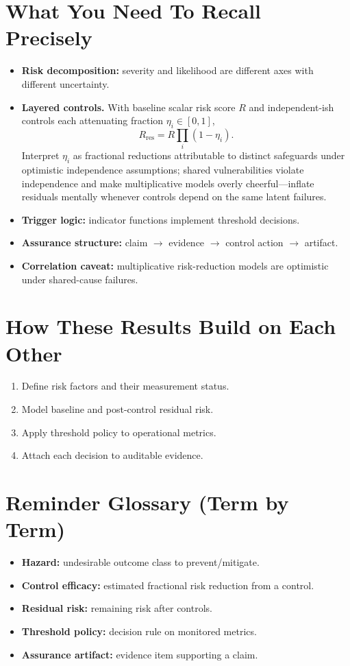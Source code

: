 \section*{What You Need To Recall Precisely}
\begin{itemize}[leftmargin=1.5em]
  \item \textbf{Risk decomposition:} severity and likelihood are different axes with different uncertainty.
  \item \textbf{Layered controls.}
  With baseline scalar risk score \(R\) and independent-ish controls each attenuating fraction \(\eta_i\in[0,1]\),
  \[
    R_{\mathrm{res}} = R \prod_{i}(1-\eta_i).
  \]
  Interpret \(\eta_i\) as fractional reductions attributable to distinct safeguards under optimistic independence assumptions; shared vulnerabilities violate independence and make multiplicative models overly cheerful---inflate residuals mentally whenever controls depend on the same latent failures.
  \item \textbf{Trigger logic:} indicator functions implement threshold decisions.
  \item \textbf{Assurance structure:} claim $\to$ evidence $\to$ control action $\to$ artifact.
  \item \textbf{Correlation caveat:} multiplicative risk-reduction models are optimistic under shared-cause failures.
\end{itemize}

\section*{How These Results Build on Each Other}
\begin{enumerate}[leftmargin=1.5em]
  \item Define risk factors and their measurement status.
  \item Model baseline and post-control residual risk.
  \item Apply threshold policy to operational metrics.
  \item Attach each decision to auditable evidence.
\end{enumerate}

\section*{Reminder Glossary (Term by Term)}
\begin{itemize}[leftmargin=1.5em]
  \item \textbf{Hazard:} undesirable outcome class to prevent/mitigate.
  \item \textbf{Control efficacy:} estimated fractional risk reduction from a control.
  \item \textbf{Residual risk:} remaining risk after controls.
  \item \textbf{Threshold policy:} decision rule on monitored metrics.
  \item \textbf{Assurance artifact:} evidence item supporting a claim.
\end{itemize}

